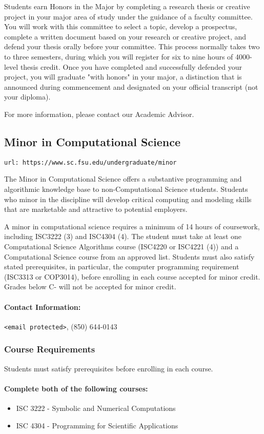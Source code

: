 \documentclass[12pt,a4paper]{article}
\begin{document}
Students earn Honors in the Major by completing a research thesis or creative project in your major area of study under the guidance of a faculty committee. You will work with this committee to select a topic, develop a prospectus, complete a written document based on your research or creative project, and defend your thesis orally before your committee. This process normally takes two to three semesters, during which you will register for six to nine hours of 4000-level thesis credit. Once you have completed and successfully defended your project, you will graduate "with honors" in your major, a distinction that is announced during commencement and designated on your official transcript (not your diploma).

For more information, please contact our Academic Advisor.

\subsection{Minor in Computational Science}
\texttt{url: https://www.sc.fsu.edu/undergraduate/minor}

The Minor in Computational Science offers a substantive programming and algorithmic knowledge base to non-Computational Science students. Students who minor in the discipline will develop critical computing and modeling skills that are marketable and attractive to potential employers.

A minor in computational science requires a minimum of 14 hours of coursework, including ISC3222 (3) and ISC4304 (4). The student must take at least one Computational Science Algorithms course (ISC4220 or ISC4221 (4)) and a Computational Science course from an approved list. Students must also satisfy stated prerequisites, in particular, the computer programming requirement (ISC3313 or COP3014), before enrolling in each course accepted for minor credit. Grades below C- will not be accepted for minor credit.

\paragraph{Contact Information:} \texttt{<email protected>}, (850) 644-0143

\subsubsection*{Course Requirements}
Students must satisfy prerequisites before enrolling in each course.
\paragraph{Complete \textbf{both} of the following courses:}
\begin{itemize}
    \item ISC 3222 - Symbolic and Numerical Computations
    \item ISC 4304 - Programming for Scientific Applications
\end{itemize}
\end{document}
